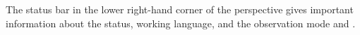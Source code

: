 
The status bar in the lower right-hand corner of the perspective gives important 
information about the \gdserver status, working language,  \gdaut{} and the observation mode and \gdomm{}. 




